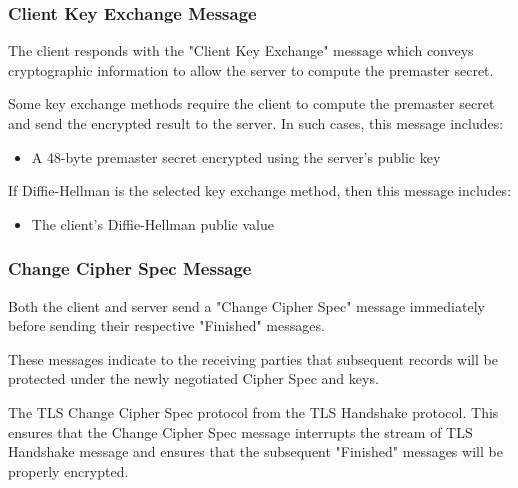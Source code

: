 \documentclass[aspectratio=169]{beamer}
\begin{document}
\begin{frame}
	\frametitle{Client Key Exchange Message}
	The client responds with the "Client Key Exchange" message which conveys cryptographic information to allow the server to compute the premaster secret.
	
	\vfill	
	
	Some key exchange methods require the client to compute the premaster secret and send the encrypted result to the server. In such cases, this message includes:
	\begin{itemize}
		\item A 48-byte premaster secret encrypted using the server's public key
	\end{itemize}
	
	\vfill	
	
	If Diffie-Hellman is the selected key exchange method, then this message includes:
	\begin{itemize}
		\item The client's Diffie-Hellman public value	
	\end{itemize}

\end{frame}

\begin{frame}
	\frametitle{Change Cipher Spec Message}
	Both the client and server send a "Change Cipher Spec" message immediately before sending their respective "Finished" messages.
	
	\vfill
	
	These messages indicate to the receiving parties that subsequent records will be
   protected under the newly negotiated Cipher Spec and keys.
   
   \vfill
   
   The TLS Change Cipher Spec protocol from the TLS Handshake protocol.  This ensures that the Change Cipher Spec message interrupts the stream of TLS Handshake message and ensures that the subsequent "Finished" messages will be properly encrypted.
\end{frame}
\end{document}
